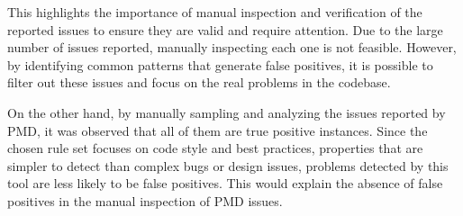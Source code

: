 This highlights the importance of manual inspection and verification of the reported issues to ensure they are valid and require attention. Due to the large number of issues reported, manually inspecting each one is not feasible. However, by identifying common patterns that generate false positives, it is possible to filter out these issues and focus on the real problems in the codebase.

On the other hand, by manually sampling and analyzing the issues reported by PMD, it was observed that all of them are true positive instances. Since the chosen rule set focuses on code style and best practices, properties that are simpler to detect than complex bugs or design issues, problems detected by this tool are less likely to be false positives. This would explain the absence of false positives in the manual inspection of PMD issues.

